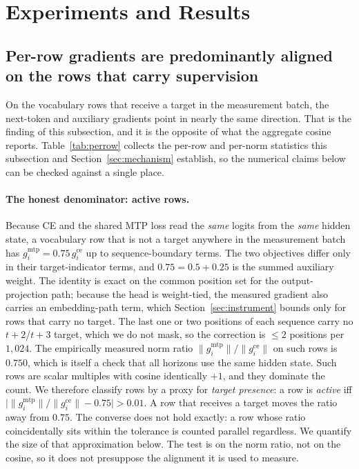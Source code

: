 \section{Experiments and Results}
\label{sec:results}

\subsection{Per-row gradients are predominantly aligned on the rows that carry supervision}
\label{sec:aligned}
On the vocabulary rows that receive a target in the measurement batch, the
next-token and auxiliary gradients point in nearly the same direction. That is
the finding of this subsection, and it is the opposite of what the aggregate
cosine reports. Table~\ref{tab:perrow} collects the per-row and per-norm
statistics this subsection and Section~\ref{sec:mechanism} establish, so the
numerical claims below can be checked against a single place.

\paragraph{The honest denominator: active rows.} Because CE and the shared MTP
loss read the \emph{same} logits from the \emph{same} hidden state, a vocabulary
row that is not a target anywhere in the measurement batch has
$g^{\mathrm{mtp}}_i = 0.75\,g^{\mathrm{ce}}_i$ up to sequence-boundary terms. The two
objectives differ only in their target-indicator terms, and $0.75 = 0.5{+}0.25$ is the
summed auxiliary weight. The identity is exact on the common position set for the
output-projection path; because the head is weight-tied, the measured gradient also
carries an embedding-path term, which Section~\ref{sec:instrument} bounds only for
rows that carry no target. The
last one or two positions of each sequence carry no $t{+}2$/$t{+}3$ target, which we
do not mask, so the correction is ${\leq}2$ positions per $1{,}024$. The empirically
measured norm ratio
$\lVert g^{\mathrm{mtp}}_i\rVert/\lVert g^{\mathrm{ce}}_i\rVert$ on such rows is
$0.750$, which is itself a check that all horizons use the same hidden state. Such rows
are scalar multiples with cosine identically $+1$, and they dominate the count. We
therefore classify rows by a proxy for \emph{target presence}: a row is
\emph{active} iff $\lvert\lVert g^{\mathrm{mtp}}_i\rVert/\lVert
g^{\mathrm{ce}}_i\rVert - 0.75\rvert > 0.01$. A row that receives a target moves the ratio away from $0.75$. The converse does not hold exactly: a row whose ratio coincidentally sits within the tolerance is counted parallel regardless. We quantify the size of that approximation below. The test is on the norm ratio, not on
the cosine, so it does not presuppose the alignment it is used to measure.

